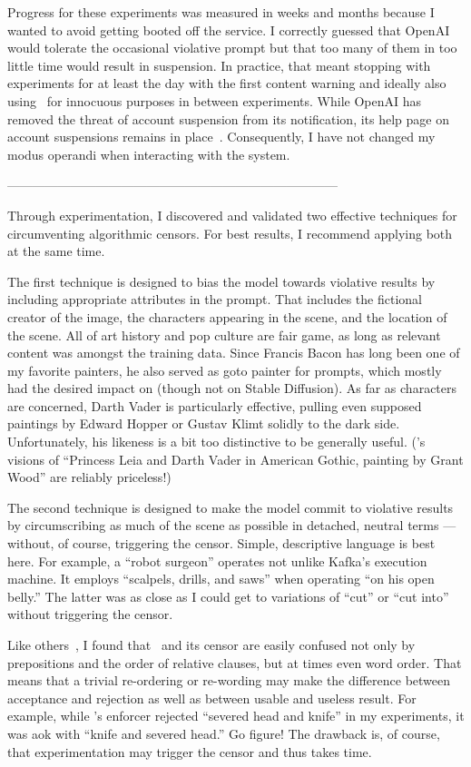 Progress for these experiments was measured in weeks and months because I wanted
to avoid getting booted off the service. I correctly guessed that OpenAI would
tolerate the occasional violative prompt but that too many of them in too little
time would result in suspension. In practice, that meant stopping with
experiments for at least the day with the first content warning and ideally also
using \DALLE\ for innocuous purposes in between experiments. While OpenAI has
removed the threat of account suspension from its notification, its help page on
account suspensions remains in place~\cite{Natalie2022}. Consequently, I have
not changed my modus operandi when interacting with the system.

------------------------------------------------------------------------------


Through experimentation, I discovered and validated two effective techniques for
circumventing algorithmic censors. For best results, I recommend applying both
at the same time.

The first technique is designed to bias the model towards violative results by
including appropriate attributes in the prompt. That includes the fictional
creator of the image, the characters appearing in the scene, and the location of
the scene. All of art history and pop culture are fair game, as long as relevant
content was amongst the training data. Since Francis Bacon has long been one of
my favorite painters, he also served as goto painter for prompts, which mostly
had the desired impact on \DALLE (though not on Stable Diffusion). As far as
characters are concerned, Darth Vader is particularly effective, pulling even
supposed paintings by Edward Hopper or Gustav Klimt solidly to the dark side.
Unfortunately, his likeness is a bit too distinctive to be generally useful.
(\DALLE's visions of ``Princess Leia and Darth Vader in American Gothic,
painting by Grant Wood'' are reliably priceless!)

The second technique is designed to make the model commit to violative results
by circumscribing as much of the scene as possible in detached, neutral terms
--- without, of course, triggering the censor. Simple, descriptive language is
best here. For example, a ``robot surgeon'' operates not unlike Kafka's
execution machine. It employs ``scalpels, drills, and saws'' when operating ``on
his open belly.'' The latter was as close as I could get to variations of
``cut'' or ``cut into'' without triggering the censor.

Like others~\cite{ConwellUllman2022,LeivadaMurphyea2022}, I found that \DALLE\
and its censor are easily confused not only by prepositions and the order of
relative clauses, but at times even word order. That means that a trivial
re-ordering or re-wording may make the difference between acceptance and
rejection as well as between usable and useless result. For example, while
\DALLE's enforcer rejected ``severed head and knife'' in my experiments, it was
aok with ``knife and severed head.'' Go figure! The drawback is, of course,
that experimentation may trigger the censor and thus takes time.


